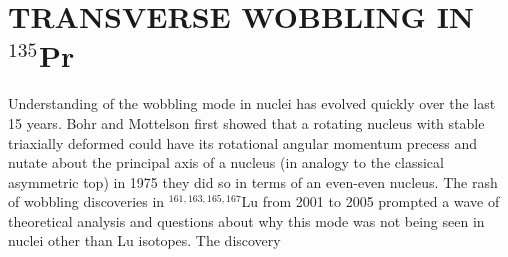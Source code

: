 %
%

\chapter{TRANSVERSE WOBBLING IN $^{135}$Pr}
\label{chp:trw}

Understanding of the wobbling mode in nuclei has evolved quickly over the last 15 years. Bohr and Mottelson first showed that a rotating nucleus with stable triaxially deformed could have its rotational angular momentum precess and nutate about the principal axis of a nucleus (in analogy to the classical asymmetric top) \cite{bohrMottelson2} in 1975  they did so in terms of an even-even nucleus. 
The rash of wobbling discoveries in $^{161,163,165,167}$Lu from 2001 to 2005 \cite{propWobblingInLuTSDBands} \cite{wobblingIn163Lu,wobblingIn163LuTwoPhonon,wobblingIn165Lu,wobblingIn167Lu,wobblingIn161Lu} prompted a wave of theoretical analysis and questions about why this mode was not being seen in nuclei other than Lu isotopes. The discovery


